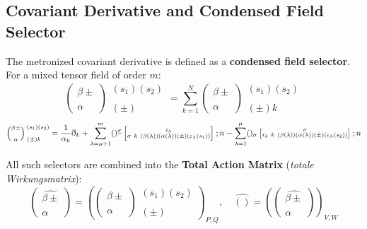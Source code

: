 \documentclass[11pt,a4paper,oneside]{article}
\newcommand{\ethop}{\eth}
\newcommand{\metroncap}[4][]{%
    \left[ \renewcommand{\arraystretch}{0.85} \substack{#2 \\ #3 \ #4} \right]_{#1}%
}
\begin{document}
\subsection{Covariant Derivative and Condensed Field Selector}

The metronized covariant derivative is defined as a \textbf{condensed field selector}. For a mixed tensor field of order $m$:
\begin{equation}
    \left(\substack{\beta \pm \\[3pt] \ \ \\ \alpha}\right)\substack{(s_1)(s_2)\\[3pt]\\(\pm)\ \quad} =\sum_{k=1}^N\left(\substack{\beta \pm \\[3pt] \ \ \\ \alpha}\right)\substack{(s_1)(s_2)\\[3pt]\\(\pm) k \quad} \tag{M27}
\end{equation}
\begin{equation*}
    \left(\substack{\beta \pm \\[3pt] \ \ \\ \alpha} \right)\substack{(s_1)(s_2)\\[3pt]\\(\pm) k \quad}=\frac{1}{\alpha_k}\ethop_k +\sum_{\lambda = \mu +1 }^m ()^{\underline{\sigma}} \metroncap{i_\lambda}{\sigma\ k}{(\beta(\lambda))(\alpha(\lambda))(\pm)(\varepsilon_\lambda(s_1))} ;n - \sum_{\lambda=1 }^\mu ()_\sigma \metroncap{\sigma}{i_\lambda \ k}{(\beta(\lambda))(\alpha(\lambda))(\pm)(\varepsilon_\lambda(s_2))};n
\end{equation*}

All such selectors are combined into the \textbf{Total Action Matrix} (\textit{totale Wirkungsmatrix}):
\begin{equation}
    \left (\substack{\widehat{\beta \pm} \\[3pt] \ \ \\ \alpha}\right) = \left (\left (\substack{\beta \pm \\[3pt] \ \ \\ \alpha }\right)\substack{(s_1)(s_2)\\[3pt] \ \\(\pm)\quad\ }\right)_{P, Q},\quad \widehat{()}= \left(\left(\substack{\widehat{\beta \pm} \\[3pt] \ \ \\ \alpha} \right)\right)_{V, W} \tag{M27a}
\end{equation}
\end{document}
